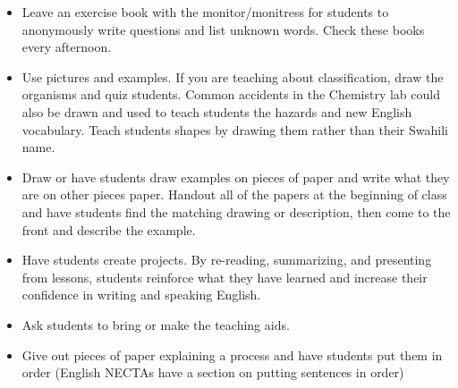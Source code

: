 \begin{itemize}
\item Leave an exercise book with the monitor/monitress for students to
anonymously write questions and list unknown words. Check these books
every afternoon. 
\item Use pictures and examples. If you are teaching about classification,
draw the organisms and quiz students. Common accidents in the Chemistry lab 
could also be drawn and used to teach students the hazards and new English vocabulary. 
Teach students shapes by drawing them rather than their Swahili name. 
\item Draw or have students draw examples on pieces of paper and write what
they are on other pieces paper. Handout all of the papers at the beginning
of class and have students find the matching drawing or description,
then come to the front and describe the example. 
\item Have students create projects. By re-reading, summarizing, and presenting
from lessons, students reinforce what they have learned and increase
their confidence in writing and speaking English.  
\item Ask students to bring or make the teaching aids. 
\item Give out pieces of paper explaining a process and have students put
them in order (English NECTAs have a section on putting sentences
in order) 
\end{itemize}

